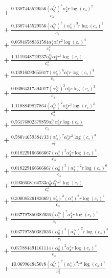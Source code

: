 \documentclass[10pt]{article}
\begin{document}
\begin{align*}
&{}  + \frac{0.1387445529556 \left(\alpha_{0}^{c_s}\right)^{4} \alpha_{2}^s r \log{\left(c_{s} \right)}^{2}}{c_{s}} \\
&{}  + \frac{0.1387445529556 \left(\alpha_{0}^{c_s}\right)^{4} \left(\alpha_{0}^s\right)^{3} r \log{\left(c_{s} \right)}^{2}}{c_{s}} \\
&{}  + \frac{0.06946588361584 \alpha_{1}^s \alpha_{3}^s r^{2} \log{\left(c_{s} \right)}^{4}}{c_{s}^{2}} \\
&{}  + \frac{1.1119348729237 \alpha_{0}^{c_s} \alpha_{3}^s r^{3} \log{\left(c_{s} \right)}}{c_{s}^{3}} \\
&{}  + \frac{0.13916093655617 \left(\alpha_{0}^s\right)^{5} \alpha_{1}^s r \log{\left(c_{s} \right)}^{3}}{c_{s}} \\
&{}  + \frac{0.06964317594017 \left(\alpha_{0}^{c_s}\right)^{3} \alpha_{3}^s r \log{\left(c_{s} \right)}^{3}}{c_{s}} \\
&{}  + \frac{1.1188849827864 \left(\alpha_{0}^{c_s}\right)^{2} \alpha_{2}^s r^{3} \log{\left(c_{s} \right)}^{2}}{c_{s}^{3}} \\
&{}  + \frac{0.56176802379859 \alpha_{0}^{c_s} \alpha_{5}^s r \log{\left(c_{s} \right)}}{c_{s}} \\
&{}  + \frac{0.58074659384733 \left(\alpha_{0}^s\right)^{2} \alpha_{3}^s r^{2} \log{\left(c_{s} \right)}^{3}}{c_{s}^{2}} \\
&{}  + \frac{0.018229166666667 \left(\alpha_{1}^s\right)^{2} \alpha_{2}^s r \log{\left(c_{s} \right)}^{6}}{c_{s}} \\
&{}  + \frac{0.018229166666667 \left(\alpha_{0}^s\right)^{3} \left(\alpha_{1}^s\right)^{2} r \log{\left(c_{s} \right)}^{6}}{c_{s}} \\
&{}  + \frac{0.5936608164733 \alpha_{0}^s \alpha_{3}^{c_s} r^{3} \log{\left(c_{s} \right)}}{c_{s}^{3}} \\
&{}  + \frac{0.30008526183669 \left(\alpha_{0}^s\right)^{3} \left(\alpha_{1}^s\right)^{2} r \log{\left(c_{s} \right)}^{4}}{c_{s}} \\
&{}  + \frac{0.037797850382036 \left(\alpha_{1}^{c_s}\right)^{2} \alpha_{2}^s r \log{\left(c_{s} \right)}^{3}}{c_{s}} \\
&{}  + \frac{0.037797850382036 \left(\alpha_{0}^s\right)^{3} \left(\alpha_{1}^{c_s}\right)^{2} r \log{\left(c_{s} \right)}^{3}}{c_{s}} \\
&{}  + \frac{0.077884491161114 \left(\alpha_{0}^s\right)^{2} \alpha_{4}^s r \log{\left(c_{s} \right)}^{4}}{c_{s}} \\
&{}  + \frac{10.069964845078 \left(\alpha_{0}^{c_s}\right)^{2} \left(\alpha_{0}^s\right)^{3} r^{3} \log{\left(c_{s} \right)}^{2}}{c_{s}^{3}} \\

\end{align*}
\end{document}
